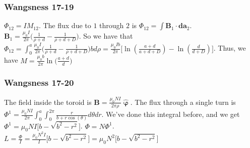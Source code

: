 \documentclass[crop=false,class=article,oneside]{standalone}
\begin{document}
        \subsubsection{Wangsness 17-19}
        $\Phi_{12} = IM_{12}$. The flux due to $1$ through $2$ is $\Phi_{12} = \int \mathbf{B}_1 \cdot \mathbf{da}_2$. $\mathbf{B}_1 = \frac{\mu_0 I}{2\pi} \big( \frac{1}{\rho+d}- \frac{1}{\rho+d+D}\big)$. So we have that $\Phi_{12} = \int_{0}^{a} \frac{\mu_0 I}{2\pi} \big(\frac{1}{\rho+d}- \frac{1}{\rho+d+D}\big) bd\rho = \frac{\mu_0 Ib}{2\pi}\big[ \ln(\frac{a+d}{a+d+D}) - \ln(\frac{d}{d+D})\big]$. Thus, we have $M = \frac{\mu_0 b}{2\pi} \ln\big(\frac{a+d}{d}\big)$
        \subsubsection{Wangsness 17-20}
        The field inside the toroid is $\mathbf{B} = \frac{\mu_0 NI}{2\pi \rho} \hat{\boldsymbol{\upvarphi}}$. The flux through a single turn is $\Phi^1 = \frac{\mu_0 NI}{2\pi} \int_{0}^{a} \int_{0}^{2\pi} \frac{r}{b+r\cos(\theta)}d\theta dr$. We've done this integral before, and we get $\Phi^1= \mu_0 NI\big[b-\sqrt{b^2-r^2}\big]$. $\Phi = N\Phi^1$. $L = \frac{\Phi}{I} = \frac{\mu_0 N^2 I}{I} \big[b-\sqrt{b^2-r^2}\big] = \mu_0 N^2 \big[b-\sqrt{b^2-r^2}\big]$
\end{document}
